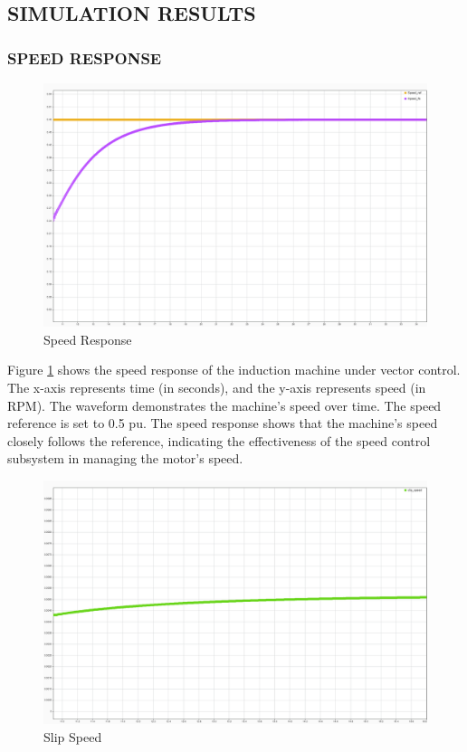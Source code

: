\subsection{SIMULATION RESULTS}



\subsubsection{SPEED RESPONSE}

\begin{figure}[H]
	\centering
	\includegraphics[width=6in]{sections/section3/images/simulationResutls/SpeedTrackingNoCursor.png}
	\caption{Speed Response}
	\label{fig:speed_response}
\end{figure}

Figure \ref{fig:speed_response} shows the speed response of the induction machine under vector control. The x-axis represents time (in seconds), and the y-axis represents speed (in RPM). The waveform demonstrates the machine's speed over time. The speed reference is set to 0.5 pu. The speed response shows that the machine's speed closely follows the reference, indicating the effectiveness of the speed control subsystem in managing the motor's speed.



\begin{figure}[H]
	\centering
	\includegraphics[width=6in]{sections/section3/images/simulationResutls/SlipSpeed.png}
	\caption{Slip Speed}
	\label{fig:slip_speed}
\end{figure}


